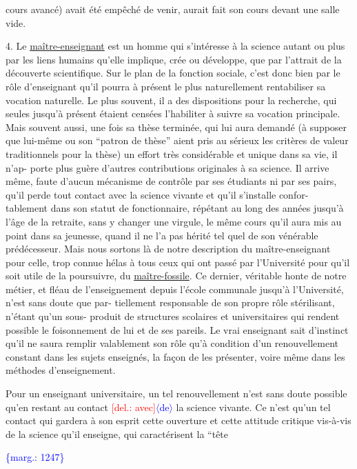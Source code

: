 \documentclass[11pt]{article}
\newcommand{\scanpage}[1]{\par\bigskip\noindent{\small\sffamily[scan #1]}\par}
\newcommand{\mspage}[1]{{\small\sffamily[p.\,#1]}}
\newcommand{\inserted}[2][]{\textcolor{blue}{$\langle$#2$\rangle$}}
\newcommand{\margin}[1]{\textcolor{blue}{\{\textsf{marg.:} #1\}}}
\newcommand{\deleted}[1]{\textcolor{red}{[\textsf{del.:} #1]}}
\newcommand{\uline}[1]{\underline{#1}}
\begin{document}
cours avancé) avait été empêché de venir, aurait fait son cours devant une
salle vide.

4. Le \uline{maître-enseignant} est un homme qui s'intéresse à la science autant ou
plus par les liens humains qu'elle implique, crée ou développe, que par
l'attrait de la découverte scientifique. Sur le plan de la fonction sociale,
c'est donc bien par le rôle d'enseignant qu'il pourra à présent le plus
naturellement rentabiliser sa vocation naturelle. Le plus souvent, il a des
dispositions pour la recherche, qui seules jusqu'à présent étaient censées
l'habiliter à suivre sa vocation principale. Mais souvent aussi, une fois sa
thèse terminée, qui lui aura demandé (à supposer que lui-même ou son
``patron de thèse'' aient pris au sérieux les critères de valeur traditionnels
pour la thèse) un effort très considérable et unique dans sa vie, il n'ap-%
porte plus guère d'autres contributions originales à sa science. Il arrive
même, faute d'aucun mécanisme de contrôle par ses étudiants ni par ses pairs,
qu'il perde tout contact avec la science vivante et qu'il s'installe confor-%
tablement dans son statut de fonctionnaire, répétant au long des années
jusqu'à l'âge de la retraite, sans y changer une virgule, le même cours qu'il
aura mis au point dans sa jeunesse, quand il ne l'a pas hérité tel quel
de son vénérable prédécesseur. Mais nous sortons là de notre description du
maître-enseignant pour celle, trop connue hélas à tous ceux qui ont passé
par l'Université pour qu'il soit utile de la poursuivre, du \uline{maître-fossile}.
Ce dernier, véritable honte de notre métier, et fléau de l'enseignement
depuis l'école communale jusqu'à l'Université, n'est sans doute que par-%
tiellement responsable de son propre rôle stérilisant, n'étant qu'un sous-%
produit de structures scolaires et universitaires qui rendent possible le
foisonnement de lui et de ses pareils. Le vrai enseignant sait d'instinct
qu'il ne saura remplir valablement son rôle qu'à condition d'un renouvellement
constant dans les sujets enseignés, la façon de les présenter, voire même
dans les méthodes d'enseignement.

Pour un enseignant universitaire, un tel renouvellement n'est sans
doute possible qu'en restant au contact \deleted{avec}\inserted{de} la science vivante. Ce n'est
qu'un tel contact qui gardera à son esprit cette ouverture et cette attitude
critique vis-à-vis de la science qu'il enseigne, qui caractérisent la ``tête

\margin{1247}

\clearpage
\scanpage{119/248}
\mspage{8}
\end{document}
